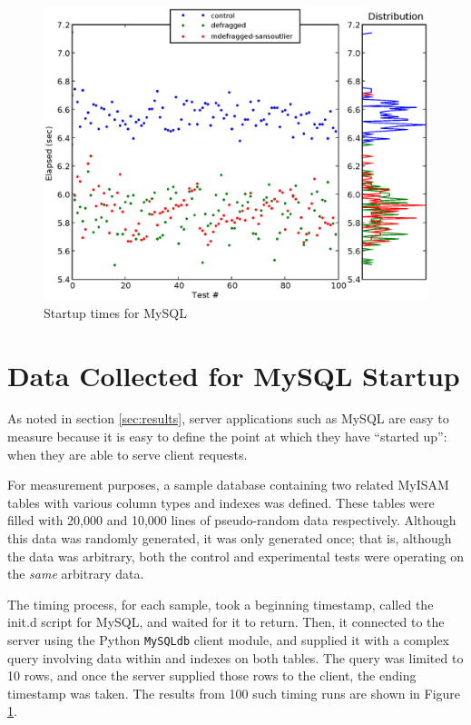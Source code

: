 \documentclass[10pt,twocolumn,letterpaper]{article}
\begin{document}
\begin{figure}[!htb]
\includegraphics[scale=0.75]{mysql-chart.eps}
\caption{Startup times for MySQL}
\label{mysqlchart}
\end{figure}

\section{Data Collected for MySQL Startup}

As noted in section \ref{sec:results}, server applications such as MySQL are easy to measure because it is easy to define the point at which they have ``started up'': when they are able to serve client requests.

For measurement purposes, a sample database containing two related MyISAM tables with various column types and indexes was defined. These tables were filled with 20,000 and 10,000 lines of pseudo-random data respectively. Although this data was randomly generated, it was only generated once; that is, although the data was arbitrary, both the control and experimental tests were operating on the \emph{same} arbitrary data.

The timing process, for each sample, took a beginning timestamp, called the init.d script for MySQL, and waited for it to return. Then, it connected to the server using the Python \texttt{MySQLdb} client module, and supplied it with a complex query involving data within and indexes on both tables. The query was limited to 10 rows, and once the
server supplied those rows to the client, the ending timestamp was taken. The results from 100 such timing runs are shown in Figure \ref{mysqlchart}.
\end{document}
